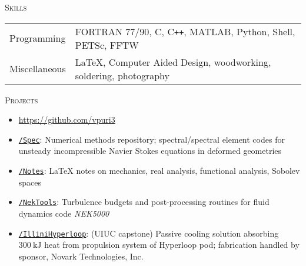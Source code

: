 \documentclass[10pt]{article}
\begin{document}
\vspace{-1.5em}
\begin{multicols}{2}
\textsc{\small Skills}
\columnbreak

\begin {table}[H]
\begin{tabular}{l l }
\hspace{-0.5em}Programming   & \hspace{-0.0em} FORTRAN 77/90, C, C\texttt{++}, MATLAB, Python, Shell, PETSc, FFTW\\
\hspace{-0.5em}Miscellaneous & \hspace{-0.0em} \LaTeX{}, Computer Aided Design, woodworking, soldering, photography \\
\end{tabular}	
\end{table}

\end{multicols}
\vspace{-1.5em}
\begin{multicols}{2}
\textsc{\small Projects}
\columnbreak

\vspace{-1.75em}
\begin{itemize}[label=-]
    \setlength{\itemindent}{-1.75em}
    \setlength\itemsep{-0.25em}
    \item[]\hspace{-1.0em} \url{https://github.com/vpuri3}
    \item \href{https://github.com/vpuri3/Spec}{\texttt{/Spec}}: Numerical methods repository; spectral/spectral element codes for unsteady incompressible Navier Stokes equations in deformed geometries
    \item \href{https://github.com/vpuri3/Notes}{\texttt{/Notes}}: \LaTeX{} notes on mechanics, real analysis, functional analysis, Sobolev spaces
    \item \href{https://github.com/vpuri3/NekTools}{\texttt{/NekTools}}: Turbulence budgets and post-processing routines for fluid dynamics code \textit{NEK5000}
    \item \href{https://github.com/vpuri3/IlliniHyperloop}{\texttt{/IlliniHyperloop}}: (UIUC capstone) Passive cooling solution absorbing $\SI{300}{\kilo \joule}$ heat from propulsion system of Hyperloop pod; fabrication handled by sponsor, Novark Technologies, Inc.
\end{itemize}
\vspace{-2.0em}

\end{multicols}
\vspace{-1.5em}
\vfill
\end{document}
